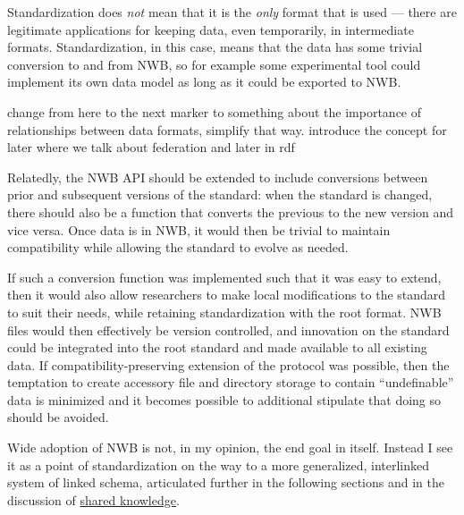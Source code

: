 \documentclass{article}
\begin{document}
Standardization does \emph{not} mean that it is the \emph{only} format
that is used --- there are legitimate applications for keeping data,
even temporarily, in intermediate formats. Standardization, in this
case, means that the data has some trivial conversion to and from NWB,
so for example some experimental tool could implement its own data model
as long as it could be exported to NWB.

\begin{leftbar}
\begin{leftbar}
\begin{leftbar}
change from here to the next marker to something about the importance of
relationships between data formats, simplify that way. introduce the
concept for later where we talk about federation and later in rdf
\end{leftbar}
\end{leftbar}
\end{leftbar}

Relatedly, the NWB API should be extended to include conversions between
prior and subsequent versions of the standard: when the standard is
changed, there should also be a function that converts the previous to
the new version and vice versa. Once data is in NWB, it would then be
trivial to maintain compatibility while allowing the standard to evolve
as needed.

If such a conversion function was implemented such that it was easy to
extend, then it would also allow researchers to make local modifications
to the standard to suit their needs, while retaining standardization
with the root format. NWB files would then effectively be version
controlled, and innovation on the standard could be integrated into the
root standard and made available to all existing data. If
compatibility-preserving extension of the protocol was possible, then
the temptation to create accessory file and directory storage to contain
``undefinable'' data is minimized and it becomes possible to additional
stipulate that doing so should be avoided.

\begin{leftbar}
\begin{leftbar}
\begin{leftbar}
\end{leftbar}
\end{leftbar}
\end{leftbar}

Wide adoption of NWB is not, in my opinion, the end goal in itself.
Instead I see it as a point of standardization on the way to a more
generalized, interlinked system of linked schema, articulated further in
the following sections and in the discussion of
\protect\hyperlink{shared-knowledge}{shared knowledge}.
\end{document}
